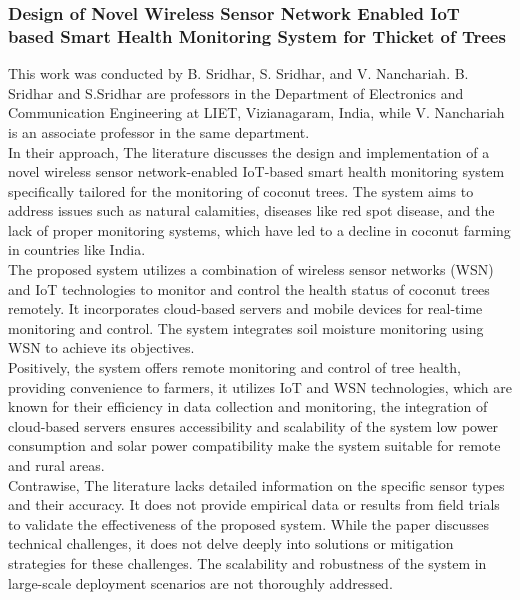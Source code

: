 \documentclass[12pt, a4paper]{article}
\begin{document}
\subsubsection{Design of Novel Wireless Sensor Network Enabled IoT based Smart Health Monitoring System for Thicket of Trees}
This work was conducted by B. Sridhar, S. Sridhar, and V. Nanchariah. B. Sridhar and S.Sridhar are professors in the Department of Electronics and Communication Engineering at LIET, Vizianagaram, India, while V. Nanchariah is an associate professor in the same department.\\
In their approach, The literature discusses the design and implementation of a novel wireless sensor network-enabled IoT-based smart health monitoring system specifically tailored for the monitoring of
coconut trees. The system aims to address issues such as natural calamities, diseases like red spot
disease, and the lack of proper monitoring systems, which have led to a decline in coconut farming in countries like India.\\
The proposed system utilizes a combination of wireless sensor networks (WSN) and IoT technologies to monitor and control the health status of coconut trees remotely. It incorporates cloud-based servers and mobile devices for real-time monitoring and control. The system integrates soil moisture monitoring using WSN to achieve its objectives.\\
Positively, the system offers remote monitoring and control of tree health, providing convenience to
farmers, it utilizes IoT and WSN technologies, which are known for their efficiency in data
collection and monitoring, the integration of cloud-based servers ensures accessibility and scalability of the system low power consumption and solar power compatibility make the system suitable for remote and rural areas.\\
Contrawise, The literature lacks detailed information on the specific sensor types and their accuracy.
It does not provide empirical data or results from field trials to validate the effectiveness of the proposed system. While the paper discusses technical challenges, it does not delve deeply into solutions or mitigation strategies for these challenges. The scalability and robustness of the system in large-scale deployment scenarios are not thoroughly addressed. 
\end{document}

